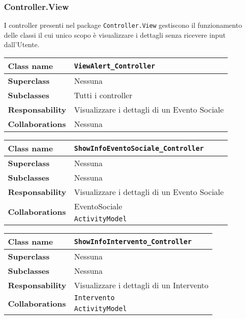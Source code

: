 \subsubsection{Controller.View}
I controller presenti nel package \texttt{Controller.View} gestiscono il funzionamento delle classi il cui unico scopo è visualizzare i dettagli senza ricevere input dall'Utente.
\begin{table}[h!]
	\begin{tabular}{|l|l|}
		\hline 
		\textbf{Class name} & \texttt{ViewAlert\_Controller}
		\\ \hline
		\textbf{Superclass} & Nessuna
		\\ \hline
		\multirow{1}{*}{\textbf{Subclasses}} & Tutti i controller
		\\ \hline
		\textbf{Responsability} & Visualizzare i dettagli di un Evento Sociale
		\\ \hline
		\multirow{1}{*}{\textbf{Collaborations}} & Nessuna \\ \hline
	\end{tabular}
\end{table} 
\begin{table}[h!]
	\begin{tabular}{|l|l|}
		\hline 
		\textbf{Class name} & \texttt{ShowInfoEventoSociale\_Controller}
		\\ \hline
		\textbf{Superclass} & Nessuna
		\\ \hline
		\multirow{1}{*}{\textbf{Subclasses}} & Nessuna
		\\ \hline
		\textbf{Responsability} & Visualizzare i dettagli di un Evento Sociale
		\\ \hline
		\multirow{2}{*}{\textbf{Collaborations}} & EventoSociale\\
		& \texttt{ActivityModel}
		\\ \hline
	\end{tabular}
\end{table} 

\begin{table}[h!]
	\begin{tabular}{|l|l|}
		\hline 
		\textbf{Class name} & \texttt{ShowInfoIntervento\_Controller}
		\\ \hline
		\textbf{Superclass} & Nessuna
		\\ \hline
		\multirow{1}{*}{\textbf{Subclasses}} & Nessuna
		\\ \hline
		\textbf{Responsability} & Visualizzare i dettagli di un Intervento
		\\ \hline
		\multirow{2}{*}{\textbf{Collaborations}} & \texttt{Intervento}\\
		& \texttt{ActivityModel}
		\\ \hline
	\end{tabular}
\end{table} 

